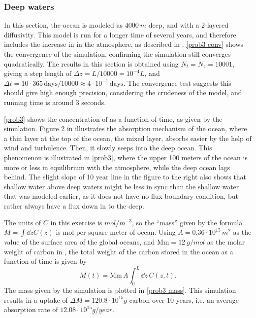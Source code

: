 \documentclass{article}
\begin{document}
    \subsubsection*{Deep waters}

    In this section, the ocean is modeled as $\SI{4000}{m}$ deep, and with a 2-layered diffusivity.
    This model is run for a longer time of several years, and therefore includes the increase in  in the atmosphere, as described in \cite{exercise}.
    \autoref{prob3 conv} shows the convergence of the simulation, confirming the simulation still converges quadratically.
    The results in this section is obtained using $N_t = N_z = 10 001$, giving a step length of $\Delta z = L / 10 000 = 10^{-4} L $, and $\Delta t = 10 \cdot 365 \, \mathrm{days} / 10 000 \approx 4 \cdot 10^{-1} \, \mathrm{days}$.
    The convergence test suggests this should give high enough precision, considering the crudeness of the model, and running time is around 3 seconds.

    \autoref{prob3} shows the concentration of  as a function of time, as given by the simulation.
    Figure 2 in \cite{exercise} illustrates the absorption mechanism of the ocean, where a thin layer at the top of the ocean, the mixed layer, absorbs  easier by the help of wind and turbulence.
    Then, it slowly seeps into the deep ocean.
    This phenomenon is illustrated in \autoref{prob3}, where the upper 100 meters of the ocean is more or less in equilibrium with the atmosphere, while the deep ocean lags behind.
    The slight slope of 10 year line in the figure to the right also shows that shallow water above deep waters might be less in sync than the shallow water that was modeled earlier, as it does not have no-flux boundary condition, but rather always have a flux down in to the deep.

    
    The units of $C$ in this exercise is $\si{mol / m^{-3}}$, so the ``mass'' given by the formula $M = \int \dd z C(z)$ is mol per square meter of ocean.
    Using $A = 0.36 \cdot 10^{15}\,\si{m^2}$ as the value of the surface area of the global oceans, and $\mathrm{Mm} = \SI{12}{g / mol}$ as the molar weight of carbon in , the total weight of the carbon stored in the ocean as a function of time is given by
    \begin{equation*}
        M(t) = \mathrm{Mm} \, A \int_0^L \dd z \, C(z, t).
    \end{equation*}
    The mass given by the simulation is plotted in \autoref{prob3 mass}.
    This simulation results in a uptake of $\Delta M = 120.8 \cdot 10^{15} \si{g}$ carbon over 10 years, i.e. an average absorption rate of $12.08 \cdot 10^{15} \si{g/year}$.
\end{document}

